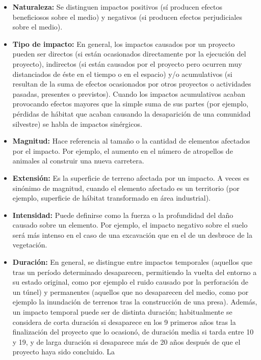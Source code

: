 \begin{itemize}
	\item \textbf{Naturaleza:} Se distinguen impactos positivos (sí producen efectos beneficiosos sobre
	      el medio) y negativos (si producen efectos perjudiciales sobre el medio).
	\item \textbf{Tipo de impacto:} En general, los impactos causados por un proyecto pueden ser
	      directos (si están ocasionados directamente por la ejecución del proyecto), indirectos (si están causados por el proyecto pero ocurren muy distanciados de éste en el
	      tiempo o en el espacio) y/o acumulativos (si resultan de la suma de efectos
	      ocasionados por otros proyectos o actividades pasadas, presentes o previstos).
	      Cuando los impactos acumulativos acaban provocando efectos mayores que la
	      simple suma de sus partes (por ejemplo, pérdidas de hábitat que acaban causando la
	      desaparición de una comunidad silvestre) se habla de impactos sinérgicos.
	\item \textbf{Magnitud:} Hace referencia al tamaño o la cantidad de elementos afectados por el
	      impacto. Por ejemplo, el aumento en el número de atropellos de animales al construir
	      una nueva carretera.
	\item \textbf{Extensión:} Es la superficie de terreno afectada por un impacto. A veces es sinónimo
	      de magnitud, cuando el elemento afectado es un territorio (por ejemplo, superficie de
	      hábitat transformado en área industrial).
	\item \textbf{Intensidad:} Puede definirse como la fuerza o la profundidad del daño causado sobre
	      un elemento. Por ejemplo, el impacto negativo sobre el suelo será más intenso en el
	      caso de una excavación que en el de un desbroce de la vegetación.
	\item \textbf{Duración:} En general, se distingue entre impactos temporales (aquellos que tras un
	      período determinado desaparecen, permitiendo la vuelta del entorno a su estado
	      original, como por ejemplo el ruido causado por la perforación de un túnel) y
	      permanentes (aquellos que no desaparecen del medio, como por ejemplo la
	      inundación de terrenos tras la construcción de una presa). Además, un impacto
	      temporal puede ser de distinta duración; habitualmente se considera de corta
	      duración si desaparece en los 9 primeros años tras la finalización del proyecto que lo
	      ocasionó, de duración media si tarda entre 10 y 19, y de larga duración si
	      desaparece más de 20 años después de que el proyecto haya sido concluido. La

\end{itemize}
